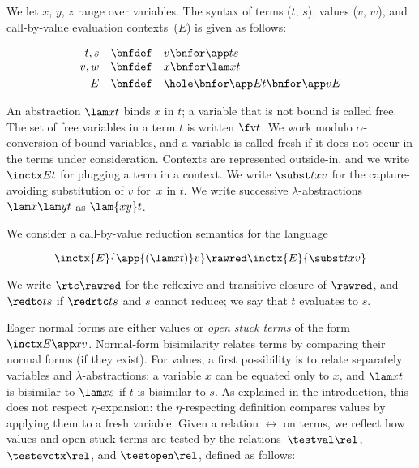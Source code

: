 \documentclass{lmcs}
\theoremstyle{defC}
\begin{document}
We let $x$, $y$, $z$ range over variables. The syntax of terms ($t$, $s$),
values ($v$, $w$), and call-by-value evaluation contexts~($E$) is given as
follows:

\[
\begin{array}{rcl}
  t,s & \bnfdef & v \bnfor \app t s
  \\
  v, w & \bnfdef & x \bnfor \lam x t
  \\[1mm]
  E & \bnfdef & \hole \bnfor \app E t \bnfor \app v E
\end{array}
\]

\vspace{2mm}\noindent An abstraction $\lam x t$ binds $x$ in $t$; a variable
that is not bound is called free. The set of free variables in a term $t$ is
written $\fv t$. We work modulo $\alpha$-conversion of bound variables, and a
variable is called fresh if it does not occur in the terms under
consideration. Contexts are represented outside-in, and we write $\inctx E t$
for plugging a term in a context. We write $\subst t x v$ for the
capture-avoiding substitution of $v$ for~$x$ in $t$. We write successive
$\lambda$-abstractions $\lam x {\lam y t}$ as $\lam{xy} t$.

We consider a call-by-value reduction semantics for the language

\[
\inctx{E}{\app{(\lam x t)} v}  \rawred \inctx{E}{\subst t x v}
\]

\vspace{2mm}\noindent We write $\rtc\rawred$ for the reflexive and transitive
closure of $\rawred$, and $\redto t s$ if $\redrtc t s$ and $s$ cannot reduce;
we say that $t$ evaluates to $s$.

Eager normal forms are either values or \emph{open stuck terms} of the form
$\inctx E {\app x v}$.  Normal-form bisimilarity relates terms by comparing
their normal forms (if they exist).  For values, a first possibility is to
relate separately variables and $\lambda$-abstractions: a variable $x$ can be
equated only to $x$, and $\lam x t$ is bisimilar to $\lam x s$ if $t$ is
bisimilar to $s$. As explained in the introduction, this does not respect
$\eta$-expansion: the $\eta$-respecting definition compares values by applying
them to a fresh variable. Given a relation $\rel$ on terms, we reflect how
values and open stuck terms are tested by the relations~$\testval \rel$,
$\testevctx \rel$, and $\testopen \rel$, defined as follows:

\end{document}
